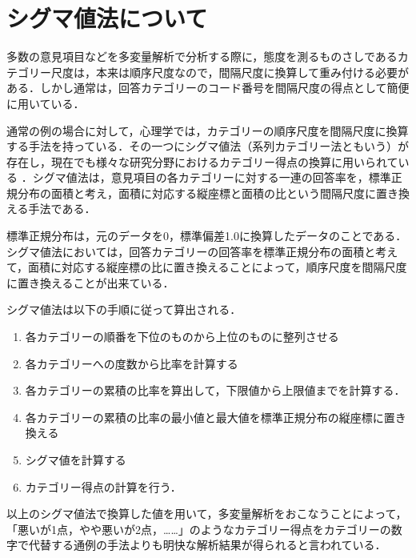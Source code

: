 \documentclass[shuuron]{kuee}
\begin{document}



\appendix
\chapter{シグマ値法について}
多数の意見項目などを多変量解析で分析する際に，態度を測るものさしであるカテゴリー尺度は，本来は順序尺度なので，間隔尺度に換算して重み付ける必要がある．しかし通常は，回答カテゴリーのコード番号を間隔尺度の得点として簡便に用いている．

通常の例の場合に対して，心理学では，カテゴリーの順序尺度を間隔尺度に換算する手法を持っている．その一つにシグマ値法（系列カテゴリー法ともいう）が存在し\cite{likert1932technique}，現在でも様々な研究分野におけるカテゴリー得点の換算に用いられている\cite{シグマ値法使ってる} \cite{岩本隆2016人事}．シグマ値法は，意見項目の各カテゴリーに対する一連の回答率を，標準正規分布の面積と考え，面積に対応する縦座標と面積の比という間隔尺度に置き換える手法である．

標準正規分布は，元のデータを0，標準偏差1.0に換算したデータのことである．シグマ値法においては，回答カテゴリーの回答率を標準正規分布の面積と考えて，面積に対応する縦座標の比に置き換えることによって，順序尺度を間隔尺度に置き換えることが出来ている．

シグマ値法は以下の手順に従って算出される．
\begin{enumerate}
  \item 各カテゴリーの順番を下位のものから上位のものに整列させる
  \item 各カテゴリーへの度数から比率を計算する
  \item 各カテゴリーの累積の比率を算出して，下限値から上限値までを計算する．
  \item 各カテゴリーの累積の比率の最小値と最大値を標準正規分布の縦座標に置き換える
  \item シグマ値を計算する
  \item カテゴリー得点の計算を行う．
\end{enumerate}

以上のシグマ値法で換算した値を用いて，多変量解析をおこなうことによって，「悪いが1点，やや悪いが2点，……」のようなカテゴリー得点をカテゴリーの数字で代替する通例の手法よりも明快な解析結果が得られると言われている．
\end{document}
